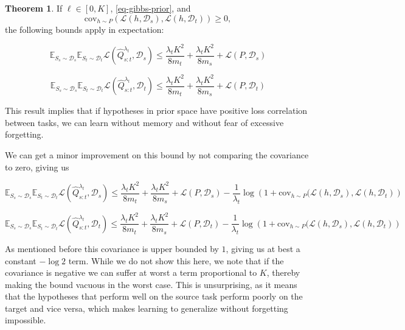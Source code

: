 \documentclass[letterpaper]{article}
\theoremstyle{definition}
\newtheorem{theorem}{Theorem}
\begin{document}
\begin{theorem}
If $\ell\in[0,K]$, \eqref{eq-gibbs-prior}, and $$\mathrm{cov}_{h\sim P}\left (\mathcal{L}(h,\mathcal{D}_s), \mathcal{L}(h,\mathcal{D}_t)\right )\geq 0,$$ the following bounds apply in expectation:    

\begin{equation} 
\mathbb{E}_{S_s\sim \mathcal{D}_s}\mathbb{E}_{S_t\sim \mathcal{D}_t}\mathcal{L}( \hat{Q}^{\lambda_t}_{s:t},\mathcal{D}_s)\leq \frac{\lambda_t K^2}{8m_t}+\frac{\lambda_t K^2}{8m_s}+\mathcal{L}(P,\mathcal{D}_s)
\end{equation}

\begin{equation} 
\mathbb{E}_{S_s\sim \mathcal{D}_s}\mathbb{E}_{S_t\sim \mathcal{D}_t}\mathcal{L}( \hat{Q}^{\lambda_t}_{s:t},\mathcal{D}_t)\leq \frac{\lambda_t K^2}{8m_t}+\frac{\lambda_t K^2}{8m_s}+\mathcal{L}(P,\mathcal{D}_t) 
\end{equation}
\end{theorem}

This result implies that if hypotheses in prior space have positive loss correlation between tasks, we can learn without memory and without fear of excessive forgetting.

We can get a minor improvement on this bound by not comparing the covariance to zero, giving us 

\begin{equation*} 
\mathbb{E}_{S_s\sim \mathcal{D}_s}\mathbb{E}_{S_t\sim \mathcal{D}_t}\mathcal{L}( \hat{Q}^{\lambda_t}_{s:t},\mathcal{D}_s)\leq \frac{\lambda_t K^2}{8m_t}+\frac{\lambda_t K^2}{8m_s}+\mathcal{L}(P,\mathcal{D}_s) - \frac{1}{\lambda_t}\log \left (1+\mathrm{cov}_{h\sim P} (\mathcal{L}(h,\mathcal{D}_s), \mathcal{L}(h,\mathcal{D}_t)\right )
\end{equation*}

\begin{equation*} 
\mathbb{E}_{S_s\sim \mathcal{D}_s}\mathbb{E}_{S_t\sim \mathcal{D}_t}\mathcal{L}( \hat{Q}^{\lambda_t}_{s:t},\mathcal{D}_t)\leq \frac{\lambda_t K^2}{8m_t}+\frac{\lambda_t K^2}{8m_s}+\mathcal{L}(P,\mathcal{D}_t) - \frac{1}{\lambda_t}\log \left (1+\mathrm{cov}_{h\sim P} (\mathcal{L}(h,\mathcal{D}_s), \mathcal{L}(h,\mathcal{D}_t) \right )
\end{equation*}

As mentioned before this covariance is upper bounded by $1$, giving us at best a constant $-\log 2$ term. While we do not show this here, we note that if the covariance is negative we can suffer at worst a term proportional to $K$, thereby making the bound vacuous in the worst case. This is unsurprising, as it means that the hypotheses that perform well on the source task perform poorly on the target and vice versa, which makes learning to generalize without forgetting impossible.
\end{document}
